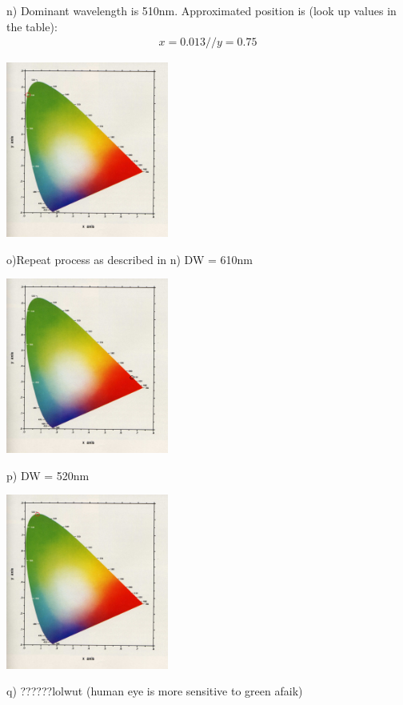 \documentclass{article}
\begin{document}
n)
Dominant wavelength is 510nm. Approximated position is (look up values in the table):
\begin{gather}  
x = 0.013 //
y = 0.75
\end{gather}
\begin{center}
\includegraphics[width=0.4\textwidth]{2n.jpg}
\end{center}
o)Repeat process as described in n) DW = 610nm
\begin{center}
\includegraphics[width=0.4\textwidth]{2o.jpg}
\end{center}
p) DW = 520nm
\begin{center}
\includegraphics[width=0.4\textwidth]{2p.jpg}
\end{center}
q) ??????lolwut (human eye is more sensitive to green afaik)
\end{document}
